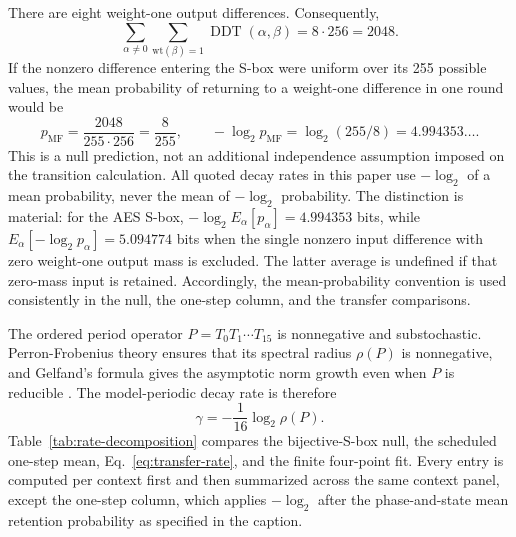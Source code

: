 \documentclass[cryptography,article,submit,oneauthor]{Definitions/mdpi}
\begin{document}
There are eight weight-one output differences. Consequently,
\begin{equation}
\sum_{\alpha\ne0}\sum_{\mathrm{wt}(\beta)=1}\operatorname{DDT}(\alpha,\beta)
=8\cdot256=2048.
\end{equation}
If the nonzero difference entering the S-box were uniform over its 255 possible values, the mean probability of returning to a weight-one difference in one round would be
\begin{equation}
p_{\mathrm{MF}}=\frac{2048}{255\cdot256}=\frac{8}{255},\qquad
-\log_2p_{\mathrm{MF}}=\log_2(255/8)=4.994353\ldots .
\label{eq:mean-field-rate}
\end{equation}
This is a null prediction, not an additional independence assumption imposed on the transition calculation. All quoted decay rates in this paper use $-\log_2$ of a mean probability, never the mean of $-\log_2$ probability. The distinction is material: for the AES S-box, $-\log_2 E_\alpha[p_\alpha]=4.994353$ bits, while $E_\alpha[-\log_2p_\alpha]=5.094774$ bits when the single nonzero input difference with zero weight-one output mass is excluded. The latter average is undefined if that zero-mass input is retained. Accordingly, the mean-probability convention is used consistently in the null, the one-step column, and the transfer comparisons.

The ordered period operator $P=T_0T_1\cdots T_{15}$ is nonnegative and substochastic. Perron-Frobenius theory ensures that its spectral radius $\rho(P)$ is nonnegative, and Gelfand's formula gives the asymptotic norm growth even when $P$ is reducible \cite{ref57}. The model-periodic decay rate is therefore
\begin{equation}
\gamma=-\frac{1}{16}\log_2\rho(P).
\label{eq:transfer-rate}
\end{equation}
Table~\ref{tab:rate-decomposition} compares the bijective-S-box null, the scheduled one-step mean, Eq.~\eqref{eq:transfer-rate}, and the finite four-point fit. Every entry is computed per context first and then summarized across the same context panel, except the one-step column, which applies $-\log_2$ after the phase-and-state mean retention probability as specified in the caption.
\end{document}
